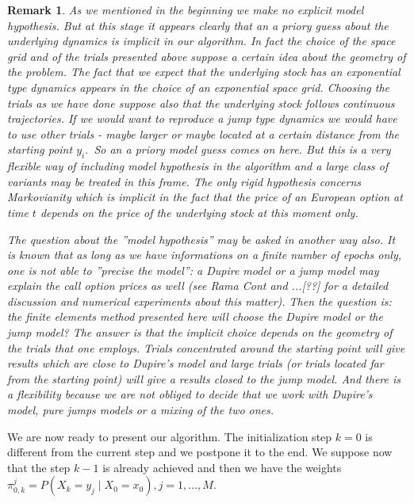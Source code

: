 \documentclass[a4paper]{article}
\newtheorem{remark}{Remark}[section]
\begin{document}
\begin{remark}
As we mentioned in the beginning we make no explicit model hypothesis. But
at this stage it appears clearly that an a priory guess about the underlying
dynamics is implicit in our algorithm. In fact the choice of the space grid
and of the trials presented above suppose a certain idea about the geometry
of the problem. The fact that we expect that the underlying stock has an
exponential type dynamics appears in the choice of an exponential space
grid. Choosing the trials as we have done suppose also that the underlying
stock follows continuous trajectories. If we would want to reproduce a jump
type dynamics we would have to use other trials - maybe larger or maybe
located at a certain distance from the starting point $y_{i}.\,$\hspace{0pt}
So an a priory model guess comes on here. But this is a very flexible way of
including model hypothesis in the algorithm and a large class of variants
may be treated in this frame. The only rigid hypothesis concerns
Markovianity which is implicit in the fact that the price of an European
option at time $t$ depends on the price of the underlying stock at this
moment only.

The question about the ''model hypothesis'' may be asked in
another way also. It is known that as long as we have informations
on a finite number of epochs only, one is not able to ''precise
the model'': a Dupire model or a jump model may explain the call
option prices as well (see Rama Cont and ...[??] for a detailed
discussion and numerical experiments about this matter). Then the
question is: the finite elements method presented here will choose
the Dupire model or the jump model? The answer is that the
implicit choice depends on the geometry of the trials that one
employs. Trials concentrated around the starting point will give
results which are close to Dupire's model and large trials (or
trials located far from the starting point) will give a results
closed to the jump model. And there is a flexibility because we
are not obliged to decide that we work with Dupire's model, pure
jumps models or a mixing of the two ones.
\end{remark}

We are now ready to present our algorithm. The initialization step $k=0$ is
different from the current step and we postpone it to the end. We suppose
now that the step $k-1$ is already achieved and then we have the weights $%
\pi _{0,k}^{j}=P(X_{k}=y_{j}\mid X_{0}=x_{0}),j=1,...,M.$
\end{document}
